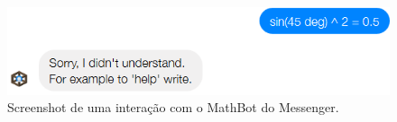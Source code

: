\begin{figure}[h!tbp]
    \centering
    \includegraphics[width=1\linewidth]{img/bot2_1.png}
    \caption{Screenshot de uma interação com o MathBot do Messenger.}
    \label{fig:bot2_1}
\end{figure}